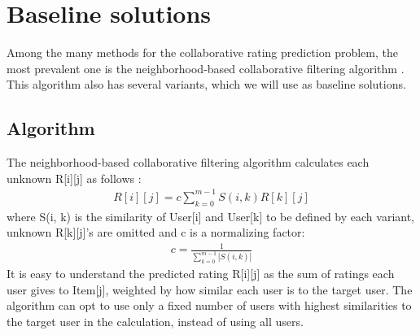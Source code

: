 \documentclass[sigconf]{acmart}
\begin{document}
\section{Baseline solutions}
Among the many methods for the collaborative rating prediction problem,
the most prevalent one is the neighborhood-based collaborative filtering 
algorithm \cite{su2009survey}.
This algorithm also has several variants,
which we will use as baseline solutions.

\subsection{Algorithm}
The neighborhood-based collaborative filtering algorithm calculates each 
unknown R[i][j] as 
follows \cite{su2009survey}:
\begin{align*}
R[i][j] = c \sum_{k = 0}^{m-1} S(i, k) R[k][j]
\end{align*}
where S(i, k) is the similarity of User[i] and User[k] to be defined by each 
variant,
unknown R[k][j]'s are omitted and c is a normalizing factor:
\begin{align*}
	c = \frac{1}{\sum_{k = 0}^{m - 1} |S(i, k)|}
\end{align*}
It is easy to understand the predicted rating R[i][j] as 
the sum of ratings each user gives to Item[j],
weighted by how similar each user is to the target user.
The algorithm can opt to use only a fixed number of users with highest 
similarities to the target user in the calculation, instead of using all users.
\end{document}
